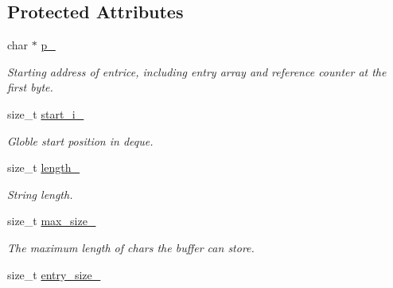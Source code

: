\subsection*{Protected Attributes}
\begin{CompactItemize}
\item 
\hypertarget{classdeque__string_a417739440e5f04229011e2646fb2ab7}{
char $\ast$ \hyperlink{classdeque__string_a417739440e5f04229011e2646fb2ab7}{p\_\-}}
\label{classdeque__string_a417739440e5f04229011e2646fb2ab7}

\begin{CompactList}\small\item\em Starting address of entrice, including entry array and reference counter at the first byte. \item\end{CompactList}\item 
\hypertarget{classdeque__string_959de8cdf04a77d8ebe553605c89be19}{
size\_\-t \hyperlink{classdeque__string_959de8cdf04a77d8ebe553605c89be19}{start\_\-i\_\-}}
\label{classdeque__string_959de8cdf04a77d8ebe553605c89be19}

\begin{CompactList}\small\item\em Globle start position in deque. \item\end{CompactList}\item 
\hypertarget{classdeque__string_432f16b5916a3b187718b6093d69a6e5}{
size\_\-t \hyperlink{classdeque__string_432f16b5916a3b187718b6093d69a6e5}{length\_\-}}
\label{classdeque__string_432f16b5916a3b187718b6093d69a6e5}

\begin{CompactList}\small\item\em String length. \item\end{CompactList}\item 
\hypertarget{classdeque__string_27d0adddfbe71cd1560ae9b63318f7c1}{
size\_\-t \hyperlink{classdeque__string_27d0adddfbe71cd1560ae9b63318f7c1}{max\_\-size\_\-}}
\label{classdeque__string_27d0adddfbe71cd1560ae9b63318f7c1}

\begin{CompactList}\small\item\em The maximum length of chars the buffer can store. \item\end{CompactList}\item 
\hypertarget{classdeque__string_f50efb6c6e27104e4ac47cf22fb2f2eb}{
size\_\-t \hyperlink{classdeque__string_f50efb6c6e27104e4ac47cf22fb2f2eb}{entry\_\-size\_\-}}
\label{classdeque__string_f50efb6c6e27104e4ac47cf22fb2f2eb}


\end{CompactItemize}
